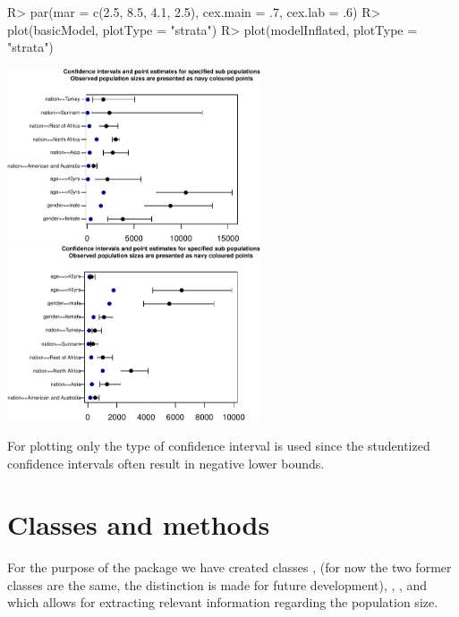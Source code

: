 \documentclass[
]{jss}
\newcommand{\1}{\mathcal{I}} \newcommand{\bZero}{\boldsymbol{0}}
\begin{document}
\begin{CodeChunk}
\begin{CodeInput}
R> par(mar = c(2.5, 8.5, 4.1, 2.5), cex.main = .7, cex.lab = .6)
R> plot(basicModel, plotType = "strata")
R> plot(modelInflated, plotType = "strata")
\end{CodeInput}


\begin{center}\includegraphics[width=7.5cm]{singleRcapture_files/figure-latex/strata_plot-1} \includegraphics[width=7.5cm]{singleRcapture_files/figure-latex/strata_plot-2} \end{center}

\end{CodeChunk}

For plotting only the  type of confidence interval is
used since the studentized confidence intervals often result in negative
lower bounds.

\section{Classes and methods}\label{sec-methods}

For the purpose of the package we have created classes
,  (for now the two former
classes are the same, the distinction is made for future development),
, ,
 and 
which allows for extracting relevant information regarding the
population size.
\end{document}
